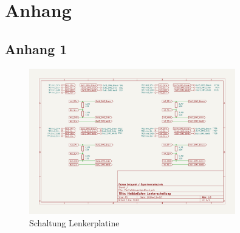 \appendix
\chapter{Anhang}
\label{cha:anhang}


\section{Anhang 1}
\label{sec:schaltplan2}

\begin{figure}[h]
    \centering
    \includegraphics[angle=90, width=0.8\textwidth]{appendices/Schaltung2.pdf}
    \caption{Schaltung Lenkerplatine}
    \label{fig:schaltung2}
\end{figure}